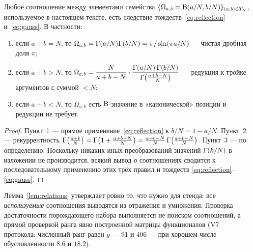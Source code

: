 \begin{lemma}\label{lem:relations}
Любое соотношение между элементами семейства
$\{\Omega_{a,b}=\mathrm{B}(a/N,b/N)\}_{(a,b)\in T_N}$, используемое в
настоящем тексте, есть следствие тождеств~\eqref{eq:reflection}
и~\eqref{eq:gauss}. В частности:
\begin{enumerate}[leftmargin=2em, itemsep=0.15em]
\item если $a+b=N$, то
  $\Omega_{a,b}=\Gamma(a/N)\Gamma(b/N)=\pi/\sin(\pi a/N)$ --- чистая дробная
  доля $\pi$;
\item если $a+b>N$, то
  $\Omega_{a,b}=\dfrac{N}{a+b-N}\cdot
  \dfrac{\Gamma(a/N)\,\Gamma(b/N)}{\Gamma\bigl(\frac{a+b-N}{N}\bigr)}$
  --- редукция к тройке аргументов с суммой $<N$;
\item если $a+b<N$, то $\Omega_{a,b}$ есть $\mathrm{B}$-значение в
  «канонической» позиции и редукции не требует.
\end{enumerate}
\end{lemma}

\begin{proof}
Пункт~1 --- прямое применение~\eqref{eq:reflection} к
$b/N=1-a/N$. Пункт~2 --- рекуррентность
$\Gamma\bigl(\frac{a+b}{N}\bigr)=\Gamma\bigl(1+\frac{a+b-N}{N}\bigr)
=\frac{a+b-N}{N}\,\Gamma\bigl(\frac{a+b-N}{N}\bigr)$. Пункт~3 --- по
определению. Поскольку никаких иных преобразований значений
$\Gamma(k/N)$ в изложении не производится, всякий вывод о соотношениях
сводится к последовательному применению этих трёх правил и тождеств
\eqref{eq:reflection}--\eqref{eq:gauss}.
\end{proof}

\begin{statusbox}
Лемма~\ref{lem:relations} утверждает ровно то, что нужно для стенда:
все \emph{используемые} соотношения выводятся из отражения и
умножения. Проверка достаточности порождающего набора выполняется не
поиском соотношений, а прямой проверкой ранга явно построенной матрицы
функционалов (V7 протокола: численный ранг равен $g$ --- $91$ и
$406$ --- при хорошем числе обусловленности $8.6$ и $18.2$).
\end{statusbox}
